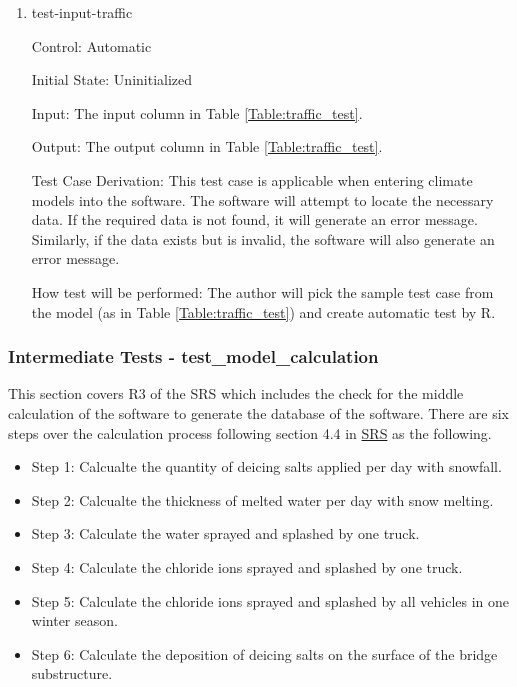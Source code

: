 \documentclass[12pt, titlepage]{article}
\begin{document}
\begin{enumerate}
\item{test-input-traffic\\}

Control: Automatic
					
Initial State: Uninitialized

Input: The input column in Table \ref{Table:traffic_test}.
					
Output: The output column in Table \ref{Table:traffic_test}. 

Test Case Derivation: This test case is applicable when entering climate models into the software. The software will attempt to locate the necessary data. If the required data is not found, it will generate an error message. Similarly, if the data exists but is invalid, the software will also generate an error message.
					
How test will be performed: The author will pick the sample test case from the model (as in Table \ref{Table:traffic_test}) and create automatic test by R.
\end{enumerate}



\subsubsection{Intermediate Tests - test\_model\_calculation}\label{t_calculation}
This section covers R3 of the SRS which includes the check for the middle calculation of the software to generate the database of the software. There are six steps over the calculation process following section 4.4 in \href{https://github.com/CynthiaLiu0805/BridgeCorrosion/blob/main/docs/SRS/SRS.pdf}{SRS} as the following.
\begin{itemize}
\item Step 1: Calcualte the quantity of deicing salts applied per day with snowfall.
\item Step 2: Calcualte the thickness of melted water per day with snow melting.
\item Step 3: Calculate the water sprayed and splashed by one truck.
\item Step 4: Calculate the chloride ions sprayed and splashed by one truck.
\item Step 5: Calculate the chloride ions sprayed and splashed by all vehicles in one winter season.
\item Step 6: Calculate the deposition of deicing salts on the surface of the bridge substructure.
\end{itemize}
\end{document}
